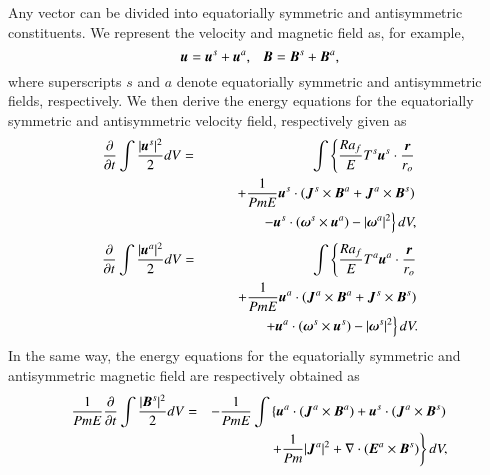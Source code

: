 Any vector can be divided into equatorially symmetric and antisymmetric constituents.
We represent the velocity and magnetic field as, for example, 
%
\begin{equation}
\mbox{\boldmath$u$} = \mbox{\boldmath$u$}^s + \mbox{\boldmath$u$}^a, ~~~
\mbox{\boldmath$B$} = \mbox{\boldmath$B$}^s + \mbox{\boldmath$B$}^a,
\label{eq:eqas}
\end{equation}
%
where superscripts $s$ and $a$ denote equatorially symmetric and antisymmetric fields, respectively.
We then derive the energy equations for the equatorially symmetric and antisymmetric velocity field, {\color{red} respectively given as}
%
\begin{eqnarray}
\displaystyle
\frac{\partial}{\partial t}
 \int \frac{|\mbox{\boldmath$u$}^s|^2}{2} d V 
 &=& \int \left\{
      \frac{Ra_f}{E}T^s \mbox{\boldmath$u$}^s\cdot \frac{\mbox{\boldmath$r$}}{r_{o}}
     \right.
\nonumber \\
& & \displaystyle
\hspace*{2em}
     \left.
    + \frac{1}{Pm E} \mbox{\boldmath$u$}^s \cdot
                (\mbox{\boldmath$J$}^s \times \mbox{\boldmath$B$}^a
                +\mbox{\boldmath$J$}^a \times \mbox{\boldmath$B$}^s)
      \right.
\nonumber \\
& &\displaystyle
\hspace*{3em}
      \left.
    - \mbox{\boldmath$u$}^s \cdot 
       (\mbox{\boldmath$\omega$}^s \times \mbox{\boldmath$u$}^a)
    - |\mbox{\boldmath$\omega$}^a|^2 
      \right\} d V,
\label{eq:energy_us}
\end{eqnarray}
%
\begin{eqnarray}
\displaystyle
\frac{\partial}{\partial t}
 \int \frac{|\mbox{\boldmath$u$}^a|^2}{2} d V 
 & = & \displaystyle
\hspace*{1em}
\int \left\{
      \frac{Ra_f}{E}T^a \mbox{\boldmath$u$}^a\cdot \frac{\mbox{\boldmath$r$}}{r_{o}}
     \right.
\nonumber \\
& & \displaystyle
\hspace*{2em}
     \left.
    + \frac{1}{Pm E} \mbox{\boldmath$u$}^a \cdot
                (\mbox{\boldmath$J$}^a \times \mbox{\boldmath$B$}^a
                +\mbox{\boldmath$J$}^s \times \mbox{\boldmath$B$}^s)
      \right.
\nonumber \\
& & \displaystyle
\hspace*{3em}
      \left.
    + \mbox{\boldmath$u$}^a \cdot 
       (\mbox{\boldmath$\omega$}^s \times \mbox{\boldmath$u$}^s)
    - |\mbox{\boldmath$\omega$}^s|^2 
      \right\} d V.
\label{eq:energy_ua}
\end{eqnarray}
%
In the same way, the energy equations for the equatorially symmetric and antisymmetric magnetic field are respectively obtained as
%
\begin{eqnarray}
\displaystyle
\frac{1}{Pm E}\frac{\partial}{\partial t}
 \int \frac{|\mbox{\boldmath$B$}^s|^2}{2} d V
 & = & - \frac{1}{Pm E}\int \left\{
      \mbox{\boldmath$u$}^a \cdot 
          ( \mbox{\boldmath$J$}^a \times \mbox{\boldmath$B$}^a )
    + \mbox{\boldmath$u$}^s \cdot 
          ( \mbox{\boldmath$J$}^a \times \mbox{\boldmath$B$}^s )
    \right.
\nonumber \\
\hspace{3em}
&& \displaystyle
    \left.
    + \frac{1}{Pm} |\mbox{\boldmath$J$}^a|^2
    + \nabla \cdot ( \mbox{\boldmath$E$}^a \times \mbox{\boldmath$B$}^s ) 
      \right\} d V,
\label{eq:energy_Bs}
\end{eqnarray}
